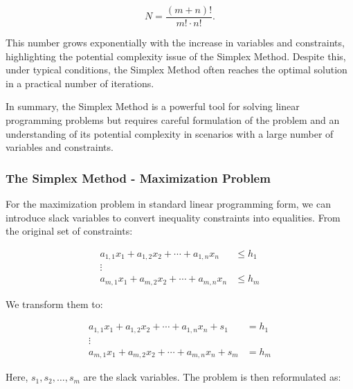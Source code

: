 \documentclass[unicode,11pt,a4paper,oneside,numbers=endperiod,openany]{scrartcl}
\begin{document}
\[
 N = \frac{(m+n)!}{m! \cdot n!}.
\]

This number grows exponentially with the increase in variables and constraints, highlighting the potential complexity issue of the Simplex Method. Despite this, under typical conditions, the Simplex Method often reaches the optimal solution in a practical number of iterations.

In summary, the Simplex Method is a powerful tool for solving linear programming problems but requires careful formulation of the problem and an understanding of its potential complexity in scenarios with a large number of variables and constraints.

\subsubsection{The Simplex Method - Maximization Problem}
For the maximization problem in standard linear programming form, we can introduce slack variables to convert inequality constraints into equalities. From the original set of constraints:

\[
\begin{aligned}
a_{1,1}x_1 + a_{1,2}x_2 + \cdots + a_{1,n}x_n &\leq h_1 \\
\vdots \\
a_{m,1}x_1 + a_{m,2}x_2 + \cdots + a_{m,n}x_n &\leq h_m
\end{aligned}
\]

We transform them to:

\[
\begin{aligned}
a_{1,1}x_1 + a_{1,2}x_2 + \cdots + a_{1,n}x_n + s_1 &= h_1 \\
\vdots \\
a_{m,1}x_1 + a_{m,2}x_2 + \cdots + a_{m,n}x_n + s_m &= h_m
\end{aligned}
\]

Here, \(s_1, s_2, \ldots, s_m\) are the slack variables. The problem is then reformulated as:
\end{document}
